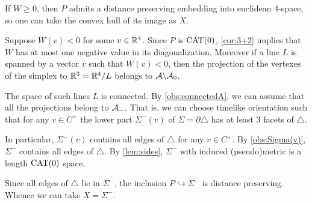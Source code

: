 \documentclass{article}
\begin{document}
If $W\ge0$, then $P$ admits a distance preserving embedding into euclidean 4-space, so one can take the convex hull of its image as $X$.

Suppose $W(v)<0$ for some $v\in\mathbb{R}^4$.
Since $P$ is $\mathrm{CAT}(0)$, \ref{cor:3+2} implies that $W$ has at most one negative value in its diagonalization.
Moreover if a line $L$ is spanned by a vector $v$ such that $W(v)<0$, then the projection of the vertexes of the simplex to $\mathbb{R}^3=\mathbb{R}^4/L$ belongs to $\mathcal{A}\backslash\mathcal{A}_0$.

The space of such lines $L$ is connected.
By \ref{obs:connectedA}, we can assume that all the projections belong to $\mathcal{A}_-$.
That is, we can choose timelike orientation such that for any $v\in C^+$ the lower part $\Sigma^-(v)$ of $\Sigma=\partial \triangle$ has at least 3 facets of $\triangle$.

In particular, $\Sigma^-(v)$ contains all edges of $\triangle$ for any $v\in C^+$.
By \ref{obs:Sigma(v)}, $\Sigma^-$ contains all edges of $\triangle$.
By \ref{lem:sides}, $\Sigma^-$ with induced (pseudo)metric is a length $\mathrm{CAT}(0)$ space.

Since all edges of $\triangle$ lie in $\Sigma^-$, the inclusion $P\hookrightarrow \Sigma^-$ is distance preserving.
Whence we can take $X=\Sigma^-$.
\qeds

{\sloppy
\printbibliography[heading=bibintoc]
\fussy
}
\end{document}
